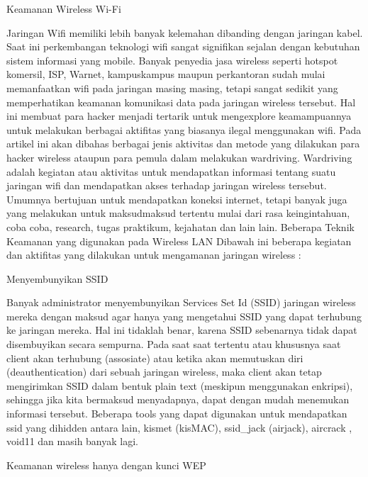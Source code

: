 Keamanan Wireless Wi-Fi

Jaringan Wifi memiliki lebih banyak kelemahan dibanding dengan jaringan kabel. Saat ini perkembangan
teknologi wifi sangat signifikan sejalan dengan kebutuhan sistem informasi yang mobile. Banyak
penyedia jasa wireless seperti hotspot komersil, ISP, Warnet, kampuskampus
maupun perkantoran sudah
mulai memanfaatkan wifi pada jaringan masing masing, tetapi sangat sedikit yang memperhatikan
keamanan komunikasi data pada jaringan wireless tersebut. Hal ini membuat para hacker menjadi tertarik
untuk mengexplore keamampuannya untuk melakukan berbagai aktifitas yang biasanya ilegal
menggunakan wifi.
Pada artikel ini akan dibahas berbagai jenis aktivitas dan metode yang dilakukan para hacker wireless
ataupun para pemula dalam melakukan wardriving. Wardriving adalah kegiatan atau aktivitas untuk
mendapatkan informasi tentang suatu jaringan wifi dan mendapatkan akses terhadap jaringan wireless
tersebut. Umumnya bertujuan untuk mendapatkan koneksi internet, tetapi banyak juga yang melakukan
untuk maksudmaksud
tertentu mulai dari rasa keingintahuan, coba coba, research, tugas praktikum,
kejahatan dan lain lain.
Beberapa Teknik Keamanan yang digunakan pada Wireless LAN
Dibawah ini beberapa kegiatan dan aktifitas yang dilakukan untuk mengamanan jaringan wireless :

Menyembunyikan SSID

Banyak administrator menyembunyikan Services Set Id (SSID) jaringan wireless mereka dengan maksud
agar hanya yang mengetahui SSID yang dapat terhubung ke jaringan mereka. Hal ini tidaklah benar,
karena SSID sebenarnya tidak dapat disembuyikan secara sempurna. Pada saat saat tertentu atau
khususnya saat client akan terhubung (assosiate) atau ketika akan memutuskan diri (deauthentication)
dari sebuah jaringan wireless, maka client akan tetap mengirimkan SSID dalam bentuk plain text
(meskipun menggunakan enkripsi), sehingga jika kita bermaksud menyadapnya, dapat dengan mudah
menemukan informasi tersebut. Beberapa tools yang dapat digunakan untuk mendapatkan ssid yang
dihidden antara lain, kismet (kisMAC), ssid_jack (airjack), aircrack ,
void11 dan masih banyak lagi.

Keamanan wireless hanya dengan kunci WEP


